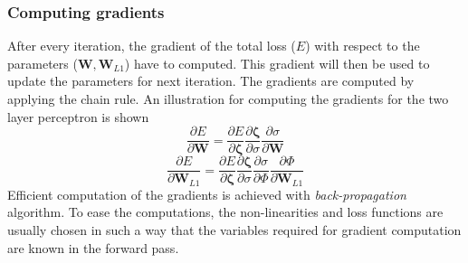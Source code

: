 \subsubsection{Computing gradients}
After every iteration, the gradient of the total loss ($E$) with respect to the parameters ($\textbf{W}, \textbf{W}_{L1}$) have to computed. This gradient will then be used to update the parameters for next iteration. The gradients are computed by applying the chain rule. An illustration for computing the gradients for the two layer perceptron is shown
\begin{equation}
\label{grad1}
\frac{\partial E}{\partial \textbf{W}} = \frac{\partial E}{\partial \bm{\zeta}}  \frac{\partial \bm{\zeta}}{\partial \sigma}  \frac{\partial \sigma}{\partial \textbf{W}}
\end{equation}
\begin{equation}
\label{grad2}
\frac{\partial E}{\partial \textbf{W}_{L1}} = \frac{\partial E}{\partial \bm{\zeta}}  \frac{\partial \bm{\zeta}}{\partial \sigma}  \frac{\partial \sigma}{\partial \Phi} \frac{\partial \Phi}{\partial \textbf{W}_{L1}}
\end{equation}
Efficient computation of the gradients is achieved with \textit{back-propagation} algorithm. To ease the computations, the non-linearities and loss functions are usually chosen in such a way that the variables required for gradient computation are known in the forward pass.

